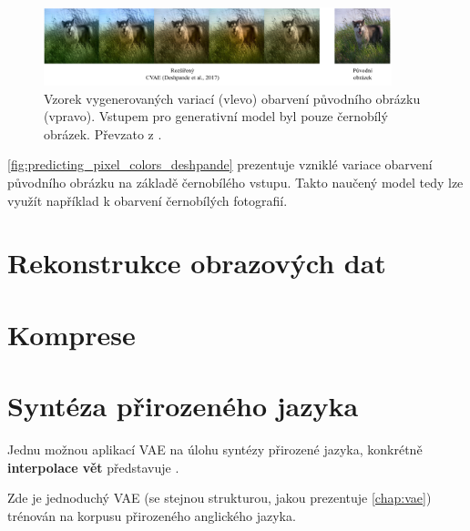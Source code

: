 \begin{figure}[H]
    \centering
    \includegraphics[width=0.9\textwidth]{figures/applications/predicting_pixel_colors_deshpande.pdf}
    \caption{Vzorek vygenerovaných variací (vlevo) obarvení původního obrázku (vpravo). Vstupem pro generativní model byl pouze černobílý obrázek. Převzato z \cite{Deshpande2017}.}
    \label{fig:predicting_pixel_colors_deshpande}
\end{figure}

\autoref{fig:predicting_pixel_colors_deshpande} prezentuje vzniklé variace obarvení původního obrázku na základě černobílého vstupu.
Takto naučený model tedy lze využít například k obarvení černobílých fotografií.

\newpage
\section{Rekonstrukce obrazových dat}

\newpage
\section{Komprese}

\newpage
\section{Syntéza přirozeného jazyka}
Jednu možnou aplikací VAE na úlohu syntézy přirozené jazyka, konkrétně \textbf{interpolace vět} představuje \cite{Bowman2016}.

Zde je jednoduchý VAE (se stejnou strukturou, jakou prezentuje \autoref{chap:vae}) trénován na korpusu přirozeného anglického jazyka.

